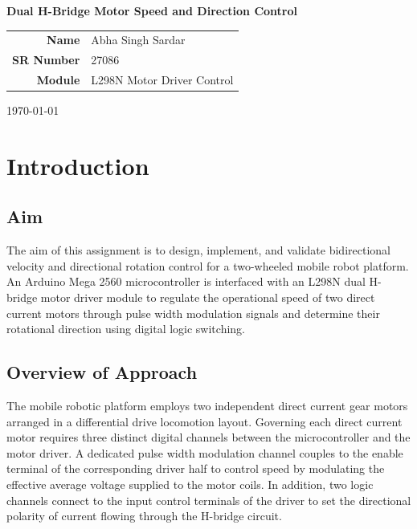 \documentclass[11pt,a4paper]{article}
\begin{document}
\begin{titlepage}
\centering
\vspace*{3cm}
{\Huge\bfseries Dual H-Bridge Motor Speed and Direction Control \par}
\vspace{2cm}
{\large
\begin{tabular}{rl}
\textbf{Name}      & Abha Singh Sardar  \\[6pt]
\textbf{SR Number} & 27086             \\[6pt]
\textbf{Module}    & L298N Motor Driver Control \\[6pt]
\end{tabular}\par}
\vspace{2.5cm}
{\large \today \par}
\vfill
\end{titlepage}

\newpage
{}

\section{Introduction}

\subsection{Aim}
The aim of this assignment is to design, implement, and validate bidirectional velocity and directional rotation control for a two-wheeled mobile robot platform. An Arduino Mega 2560 microcontroller is interfaced with an L298N dual H-bridge motor driver module to regulate the operational speed of two direct current motors through pulse width modulation signals and determine their rotational direction using digital logic switching.

\subsection{Overview of Approach}
The mobile robotic platform employs two independent direct current gear motors arranged in a differential drive locomotion layout. Governing each direct current motor requires three distinct digital channels between the microcontroller and the motor driver. A dedicated pulse width modulation channel couples to the enable terminal of the corresponding driver half to control speed by modulating the effective average voltage supplied to the motor coils. In addition, two logic channels connect to the input control terminals of the driver to set the directional polarity of current flowing through the H-bridge circuit.
\end{document}
